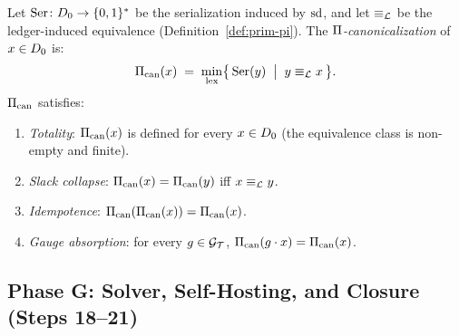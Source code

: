 \begin{definition}
\label{def:pi-canon}
Let $\mathrm{Ser} \colon D_0 \to \{0,1\}^*$ be the serialization induced by
$\mathrm{sd}$, and let $\equiv_{\mathcal{L}}$ be the ledger-induced equivalence
(Definition~\ref{def:prim-pi}).  The \emph{$\Pi$-canonicalization} of
$x \in D_0$ is:
\[
  \Pi_{\mathrm{can}}(x) \;=\; \min_{\mathrm{lex}}\bigl\{\,\mathrm{Ser}(y) \;\bigm|\; y \equiv_{\mathcal{L}} x\,\bigr\}.
\]
$\Pi_{\mathrm{can}}$ satisfies:
\begin{enumerate}[nosep]
  \item \emph{Totality}: $\Pi_{\mathrm{can}}(x)$ is defined for every $x \in D_0$
        (the equivalence class is non-empty and finite).
  \item \emph{Slack collapse}: $\Pi_{\mathrm{can}}(x) = \Pi_{\mathrm{can}}(y)$ iff $x \equiv_{\mathcal{L}} y$.
  \item \emph{Idempotence}: $\Pi_{\mathrm{can}}(\Pi_{\mathrm{can}}(x)) = \Pi_{\mathrm{can}}(x)$.
  \item \emph{Gauge absorption}: for every $g \in \mathcal{G}_{\mathcal{T}}$,
        $\Pi_{\mathrm{can}}(g \cdot x) = \Pi_{\mathrm{can}}(x)$.
\end{enumerate}
\end{definition}

\subsection{Phase G: Solver, Self-Hosting, and Closure (Steps 18--21)}
\label{sec:derivation:solver}

